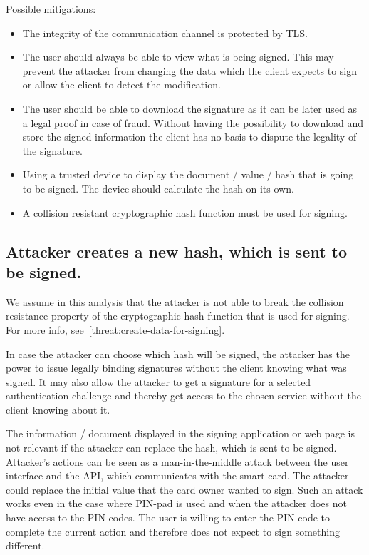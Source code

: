 Possible mitigations:
\begin{itemize}
\item The integrity of the communication channel is protected by TLS.

\item The user should always be able to view what is being signed. This may prevent the attacker from changing the data which the client expects to sign or allow the client to detect the modification. 

\item The user should be able to download the signature as it can be later used as a legal proof in case of fraud. Without having the possibility to download and store the signed information the client has no basis to dispute the legality of the signature. 

\item Using a trusted device to display the document / value / hash that is going to be signed. The device should calculate the hash on its own.
	
\item A collision resistant cryptographic hash function must be used for signing.
\end{itemize}







\subsection{Attacker creates a new hash, which is sent to be signed.}
\label{threat:create-hash-for-signing}
We assume in this analysis that the attacker is not able to break the collision resistance property of the cryptographic hash function that is used for signing. For more info, see~\ref{threat:create-data-for-signing}.

In case the attacker can choose which hash will be signed, the attacker has the power to issue legally binding signatures without the client knowing what was signed. It may also allow the attacker to get a signature for a selected authentication challenge and thereby get access to the chosen service without the client knowing about it.

The information / document displayed in the signing application  or web page is not relevant if the attacker can replace the hash, which is sent to be signed. Attacker's actions can be seen as a man-in-the-middle attack between the user interface and the API, which communicates with the smart card. The attacker could replace the initial value that the card owner wanted to sign. Such an attack works even in the case where PIN-pad is used and when the attacker does not have access to the PIN codes. The user is willing to enter the PIN-code to complete the current action and therefore does not expect to sign something different.

